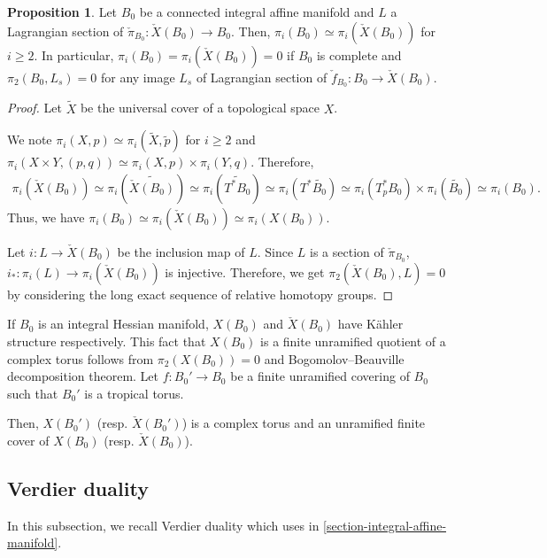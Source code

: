 \documentclass[a4paper,dvipdfmx,reqno,12pt]{amsart}
\theoremstyle{definition}
\newtheorem{proposition}[theorem]{Proposition}
\numberwithin{equation}{section}
\begin{document}
\begin{proposition}

\label{proposition-unobstructed-lagrangian}
Let $B_0$ be a connected integral affine manifold 
and $L$ a Lagrangian section of 
$\check{\pi}_{B_0}\colon \check{X}(B_0)\to B_0$. 
Then, $\pi_i(B_0)\simeq \pi_i(\check{X}(B_0))$ 
for $i\geq 2$.
In particular, 
$\pi_i(B_0)=\pi_i(\check{X}(B_0))=0$ if 
$B_0$ is complete and $\pi_2(B_0,L_s)=0$ for any image
$L_s$ of 
Lagrangian section of $\check{f}_{B_0}\colon B_0 \to \check{X}(B_0)$.
\end{proposition}
\begin{proof}
Let $\widetilde{X}$ be the universal cover of 
a topological space $X$.


We note $\pi_{i}(X,p)\simeq 
\pi_{i}(\widetilde{X},\tilde{p})$ for $i\geq 2$ and 
$\pi_{i}(X\times Y,(p,q))\simeq \pi_i(X,p)
\times \pi_i(Y,q)$. Therefore,
\begin{align}
\pi_{i}(\check{X}(B_0))\simeq 
\pi_{i}(\widetilde{\check{X}(B_0)})\simeq 
\pi_{i}(\widetilde{T^{*}B_0})\simeq 
\pi_{i}(T^{*}\widetilde{B_0})\simeq 
\pi_{i}(T_p^* B_0)\times \pi_{i}(\widetilde{B_0})\simeq 
\pi_{i}(B_0).
\end{align}
Thus, we have 
$\pi_{i}(B_0)\simeq \pi_{i}(\check{X}(B_0))\simeq 
\pi_{i}(X(B_0))$. 

Let $i\colon L\to \check{X}(B_0)$ be the inclusion map of 
$L$.
Since $L$ is a section of 
$\check{\pi}_{B_0}$, 
$i_*\colon \pi_i(L)\to \pi_i(\check{X}(B_0))$ is 
injective. Therefore, we get 
$\pi_2(\check{X}(B_0),L)=0$ by considering the long exact
sequence of relative homotopy groups.
\end{proof}

If $B_0$ is an integral Hessian manifold, 
$X(B_0)$ and $\check{X}(B_0)$ have K\"ahler structure 
respectively.
This fact that $X(B_0)$ is a finite unramified quotient
of a complex torus follows from $\pi_2(X(B_0))=0$ 
and Bogomolov--Beauville decomposition theorem.
Let $f:B_0' \to B_0$ be a finite unramified covering of $B_0$ such that $B_0'$ is a tropical torus.

Then, $X(B_0')$ (resp. $\check{X}(B_0')$) 
is a complex torus and an unramified finite cover 
of $X(B_0)$ (resp. $\check{X}(B_0)$). 



\subsection{Verdier duality} \label{section-verdier-dual}
In this subsection, we recall Verdier duality which 
uses in \cref{section-integral-affine-manifold}.
\end{document}
